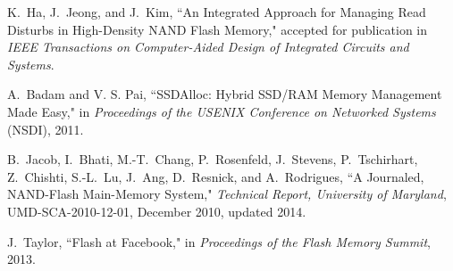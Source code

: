 \begin{thebibliography}{00}

K.~Ha, J.~Jeong, and J.~Kim,
``An Integrated Approach for Managing Read Disturbs in High-Density NAND Flash Memory,"
accepted for publication in \emph{IEEE Transactions on Computer-Aided Design of Integrated Circuits and Systems}.

A.~Badam and V. S. Pai,
``SSDAlloc: Hybrid SSD/RAM Memory Management Made Easy,"
in \emph{Proceedings of the USENIX Conference on Networked Systems} (NSDI), 2011.

B.~Jacob, I.~Bhati, M.-T.~Chang, P.~Rosenfeld, J.~Stevens, P.~Tschirhart, Z.~Chishti, S.-L.~Lu, J.~Ang, D.~Resnick, and A.~Rodrigues,
``A Journaled, NAND-Flash Main-Memory System,"
\emph{Technical Report, University of Maryland}, UMD-SCA-2010-12-01, December 2010, updated 2014.

J.~Taylor,
``Flash at Facebook,"
in \emph{Proceedings of the Flash Memory Summit}, 2013.

\end{thebibliography}
